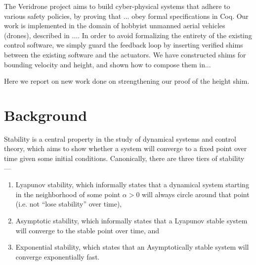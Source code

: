 \documentclass{sigplanconf}
\begin{document}


The Veridrone project aims to build cyber-physical systems that adhere to various safety policies, by proving that ... obey formal specifications in Coq. Our work is implemented in the domain of hobbyist unmanned aerial vehicles (drones), described in .... In order to avoid formalizing the entirety of the existing control software, we simply guard the feedback loop by inserting verified shims between the existing software and the actuators.
We have constructed shims for bounding velocity and height, and shown how to compose them in...

Here we report on new work done on strengthening our proof of the height shim.

\section{Background}


Stability is a central property in the study of dynamical systems and control theory, which aims to show whether a system will converge to a fixed point over time given some initial conditions. Canonically, there are three tiers of stability ---

\begin{enumerate}
\item Lyapunov stability, which informally states that a dynamical system starting in the neighborhood of some point $\alpha > 0$ will always circle around that point (i.e. not ``lose stability'' over time),

\item  Asymptotic stability, which informally states that a Lyapunov stable system will converge to the stable point over time, and

\item  Exponential stability, which states that an Asymptotically stable system will converge exponentially fast.
\end{enumerate}
\end{document}
